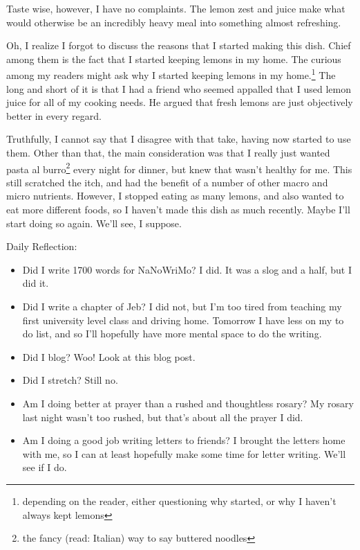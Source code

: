\documentclass[12pt]{article}[titlepage]
\newcommand{\1}{\={a}}
\newcommand{\2}{\={e}}
\newcommand{\3}{\={\i}}
\newcommand{\4}{\=o}
\newcommand{\5}{\=u}
\newcommand{\6}{\={A}}
\renewcommand{\,}{\textsuperscript{,}}
\begin{document}
Taste wise, however, I have no complaints.
The lemon zest and juice make what would otherwise be an incredibly heavy meal into something almost refreshing.

Oh, I realize I forgot to discuss the reasons that I started making this dish.
Chief among them is the fact that I started keeping lemons in my home.
The curious among my readers might ask why I started keeping lemons in my home.\footnote{depending on the reader, either questioning why started, or why I haven't always kept lemons}
The long and short of it is that I had a friend who seemed appalled that I used lemon juice for all of my cooking needs.
He argued that fresh lemons are just objectively better in every regard.

Truthfully, I cannot say that I disagree with that take, having now started to use them.
Other than that, the main consideration was that I really just wanted pasta al burro\footnote{the fancy (read: Italian) way to say buttered noodles} every night for dinner, but knew that wasn't healthy for me.
This still scratched the itch, and had the benefit of a number of other macro and micro nutrients.
However, I stopped eating as many lemons, and also wanted to eat more different foods, so I haven't made this dish as much recently.
Maybe I'll start doing so again.
We'll see, I suppose.

Daily Reflection:
\begin{itemize}
\item Did I write 1700 words for NaNoWriMo? I did. It was a slog and a half, but I did it.
\item Did I write a chapter of Jeb? I did not, but I'm too tired from teaching my first university level class and driving home.
Tomorrow I have less on my to do list, and so I'll hopefully have more mental space to do the writing.
\item Did I blog? Woo! Look at this blog post.
\item Did I stretch? Still no.
\item Am I doing better at prayer than a rushed and thoughtless rosary? My rosary last night wasn't too rushed, but that's about all the prayer I did.
\item Am I doing a good job writing letters to friends? I brought the letters home with me, so I can at least hopefully make some time for letter writing. We'll see if I do.
\end{itemize}
\end{document}
